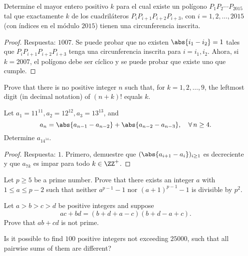 \begin{probEG}
	Determine el mayor entero positivo $k$ para el cual existe un polígono $P_1P_2\cdots P_{2015}$ tal que exactamente $k$ de los cuadriláteros $P_iP_{i+1}P_{i+2}P_{i+3}$, con $i=1,2,\dots,2015$ (con índices en el módulo $2015$) tienen una circunferencia inscrita.
\end{probEG}

\begin{proof}
	Respuesta: $1007$. Se puede probar que no existen $\abs{i_1-i_2}=1$ tales que $P_iP_{i+1}P_{i+2}P_{i+3}$ tenga una circunferencia inscrita para $i=i_1,i_2$. Ahora, si $k=2007$, el polígono debe ser cíclico y se puede probar que existe uno que cumple.
\end{proof}


\begin{probEG}
	Prove that there is no positive integer $n$ such that, for $k=1,2,\dots,9$, the leftmost digit (in decimal notation) of $(n+k)!$ equals $k$.
\end{probEG}

\begin{probMR}
	Let $a_1=11^{11},a_2=12^{12},a_3=13^{13}$, and
	\[a_n=\abs{a_{n-1}-a_{n-2}}+\abs{a_{n-2}-a_{n-3}},\quad\forall\,n\ge 4.\]
	Determine $a_{14^{14}}$.
\end{probMR}

\begin{proof}
	Respuesta: $1$. Primero, demuestre que $(\abs{a_{i+1}-a_i})_{i\ge 1}$ es decreciente y que $a_{7k}$ es impar para todo $k\in\ZZ^+$.
\end{proof}

\begin{problem}
	Let $p\ge 5$ be a prime number. Prove that there exists an integer $a$ with $1\le a\le p-2$ such that neither $a^{p-1}-1$ nor $(a+1)^{p-1}-1$ is divisible by $p^2$.
\end{problem}

\begin{problem}
	Let $a>b>c>d$ be positive integers and suppose
	\[ac+bd=(b+d+a-c)(b+d-a+c).\]
	Prove that $ab+cd$ is not prime.
\end{problem}

\begin{problem}
	Is it possible to find $100$ positive integers not exceeding $25000$, such that all pairwise sums of them are different?
\end{problem}
